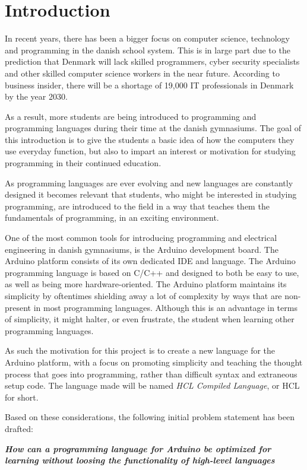 \chapter{Introduction}
In recent years, there has been a bigger focus on computer science, technology and programming in the danish school system.
This is in large part due to the prediction that Denmark will lack skilled programmers, cyber security specialists and other skilled computer science workers in the near future.
According to business insider, there will be a shortage of 19,000 IT professionals in Denmark by the year 2030.\cite{ITLackDK}

As a result, more students are being introduced to programming and programming languages during their time at the
danish gymnasiums. 
The goal of this introduction is to give the students a basic idea of how the computers they use everyday function, but also to impart an interest or motivation for studying programming in their continued education.

As programming languages are ever evolving and new languages are constantly designed it becomes relevant
that students, who might be interested in studying programming, are introduced to the field in a way that
teaches them the fundamentals of programming, in an exciting environment.

One of the most common tools for introducing programming and electrical engineering in danish gymnasiums, is the Arduino development board. 
The Arduino platform consists of its own dedicated IDE and language.
The Arduino programming language is based on C/C++ and designed to both be easy to use, as well as being
more hardware-oriented.\cite{ArFAQ}
The Arduino platform maintains its simplicity by oftentimes shielding away a lot of complexity by ways
that are non-present in most programming languages.
Although this is an advantage in terms of simplicity, it might halter, or even frustrate, the student when learning other programming languages.

As such the motivation for this project is to create a new language for the Arduino platform, with a focus on promoting simplicity and teaching the thought process that goes into programming, rather than difficult syntax and extraneous setup code.
The language made will be named \textit{HCL Compiled Language}, or HCL for short.

Based on these considerations, the following initial problem statement has been drafted:

\begin{center}
	\textit{\textbf{How can a programming language for Arduino be optimized for learning without 
			loosing the functionality of high-level languages}}
\end{center}
